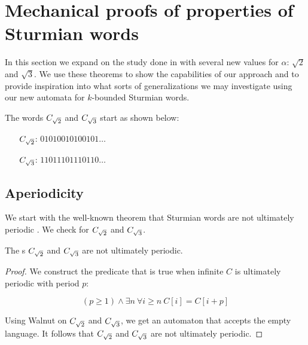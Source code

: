 \section{Mechanical proofs of properties of Sturmian words}\label{sec:specific-theorems}

In this section we expand on the study done in  with several new values for $\alpha$: $\sqrt{2}$ and $\sqrt{3}$.
We use these theorems to show the capabilities of our approach and to provide inspiration into what sorts of generalizations we may investigate using our new automata for $k$-bounded Sturmian words.

The words $C_{\sqrt{2}}$ and $C_{\sqrt{3}}$ start as shown below:

\begin{itemize}
    \item[$C_{\sqrt{2}}$:] $01010010100101 \ldots$
    \item[$C_{\sqrt{3}}$:] $11011101110110 \ldots$
\end{itemize}

\subsection{Aperiodicity}

We start with the well-known theorem that Sturmian words are not ultimately periodic .
We check for $C_{\sqrt{2}}$ and $C_{\sqrt{3}}$.

\begin{theorem}\label{thm:ulti_period_C}
The \word{}s $C_{\sqrt{2}}$ and $C_{\sqrt{3}}$ are not ultimately periodic.
\end{theorem}
\begin{proof}
We construct the predicate that is true when infinite \word $C$ is ultimately periodic with period $p$:

\[(p\ge 1) \wedge \exists n~ \forall i \ge n ~ C[i] = C[i+p]\]

Using Walnut on $C_{\sqrt{2}}$ and $C_{\sqrt{3}}$, we get an automaton that accepts the empty language. It follows that $C_{\sqrt{2}}$ and $C_{\sqrt{3}}$ are not ultimately periodic.
\end{proof}

